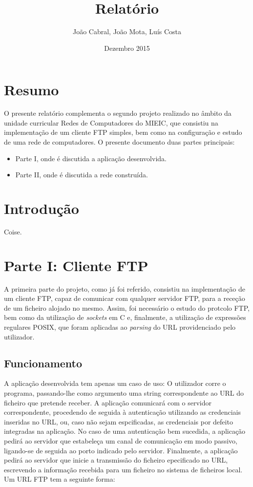 \documentclass{article}
\title{Relatório}
\author{João Cabral, João Mota, Luís Costa }
\date{Dezembro 2015}
\begin{document}
\maketitle
\newpage
\tableofcontents

\section{Resumo}
O presente relatório complementa o segundo projeto realizado no âmbito da unidade curricular Redes de Computadores do MIEIC, que consistiu na implementação de um cliente FTP simples, bem como na configuração e estudo de uma rede de computadores.
O presente documento duas partes principais:
\begin{itemize}
\item Parte I, onde é discutida a aplicação desenvolvida.
\item Parte II, onde é discutida a rede construída.
\end{itemize}


\newpage
\section{Introdução}
Coise.


\section{Parte I: Cliente FTP}

A primeira parte do projeto, como já foi referido, consistiu na implementação de um cliente FTP, capaz de comunicar com qualquer servidor FTP, para a receção de um ficheiro alojado no mesmo. Assim, foi necessário o estudo do protcolo FTP, bem como da utilização de \textit{sockets} em C e, finalmente, a utilização de expressões regulares POSIX, que foram aplicadas ao \textit{parsing} do URL providenciado pelo utilizador.

\subsection{Funcionamento}

A aplicação desenvolvida tem apenas um caso de uso: O utilizador corre o programa, passando-lhe como argumento uma string correspondente ao URL do ficheiro que pretende receber. A aplicação comunicará com o servidor correspondente, procedendo de seguida à autenticação utilizando as credenciais inseridas no URL, ou, caso não sejam espcificadas, as credenciais por defeito integradas na aplicação. No caso de uma autenticação bem sucedida, a aplicação pedirá ao servidor que estabeleça um canal de comunicação em modo passivo, ligando-se de seguida ao porto indicado pelo servidor. Finalmente, a aplicação pedirá ao servidor que inicie a transmissão do ficheiro epecificado no URL, escrevendo a informação recebida para um ficheiro no sistema de ficheiros local.
Um URL FTP tem a seguinte forma:
\end{document}
